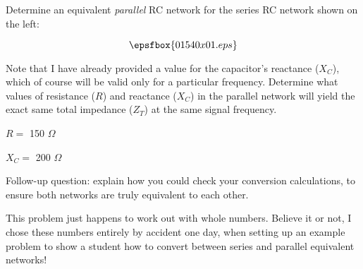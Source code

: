 

Determine an equivalent {\it parallel} RC network for the series RC network shown on the left:

$$\epsfbox{01540x01.eps}$$

Note that I have already provided a value for the capacitor's reactance ($X_C$), which of course will be valid only for a particular frequency.  Determine what values of resistance ($R$) and reactance ($X_C$) in the parallel network will yield the exact same total impedance ($Z_T$) at the same signal frequency.







$R =$ 150 $\Omega$

\vskip 10pt

$X_C =$ 200 $\Omega$

\vskip 10pt

Follow-up question: explain how you could check your conversion calculations, to ensure both networks are truly equivalent to each other.







This problem just happens to work out with whole numbers.  Believe it or not, I chose these numbers entirely by accident one day, when setting up an example problem to show a student how to convert between series and parallel equivalent networks!




